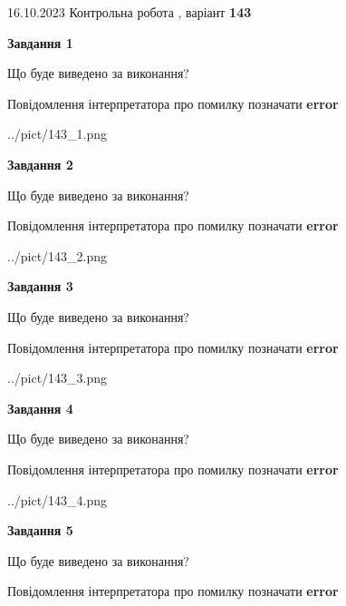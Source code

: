 \documentclass[12pt, ukrainian]{article}
\begin{document}
{\Large{16.10.2023 Контрольна робота , варіант  \No \textbf { 143 }\par}}
{
\begin {large}
{\begin {center}\textbf{Завдання 1}\end {center}}\par
Що буде виведено за виконання? \par
Повідомлення інтерпретатора про помилку позначати \textbf{error}

\begin{center}
	{../pict/143_1.png}
\end{center}
\newpage

{\begin {center}\textbf{Завдання 2}\end {center}}\par
Що буде виведено за виконання? \par
Повідомлення інтерпретатора про помилку позначати \textbf{error}

\begin{center}
	{../pict/143_2.png}
\end{center}
\newpage

{\begin {center}\textbf{Завдання 3}\end {center}}\par
Що буде виведено за виконання? \par
Повідомлення інтерпретатора про помилку позначати \textbf{error}

\begin{center}
	{../pict/143_3.png}
\end{center}
\newpage

{\begin {center}\textbf{Завдання 4}\end {center}}\par
Що буде виведено за виконання? \par
Повідомлення інтерпретатора про помилку позначати \textbf{error}

\begin{center}
	{../pict/143_4.png}
\end{center}
\newpage

{\begin {center}\textbf{Завдання 5}\end {center}}\par
Що буде виведено за виконання? \par
Повідомлення інтерпретатора про помилку позначати \textbf{error}


\end{large}}
\end{document}
